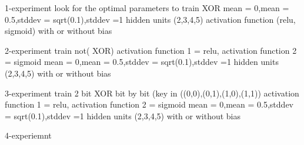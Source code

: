 1-experiment
look for the optimal parameters to train XOR
mean = 0,mean = 0.5,stddev = sqrt(0.1),stddev =1
hidden units (2,3,4,5)
activation function (relu, sigmoid)
with or without bias


2-experiment
train not( XOR)
activation function 1 = relu, activation function 2 = sigmoid 
mean = 0,mean = 0.5,stddev = sqrt(0.1),stddev =1
hidden units (2,3,4,5)
with or without bias

3-experiment
train 2 bit XOR bit by bit (key in ((0,0),(0,1),(1,0),(1,1))
activation function 1 = relu, activation function 2 = sigmoid 
mean = 0,mean = 0.5,stddev = sqrt(0.1),stddev =1
hidden units (2,3,4,5)
with or without bias

4-experiemnt





